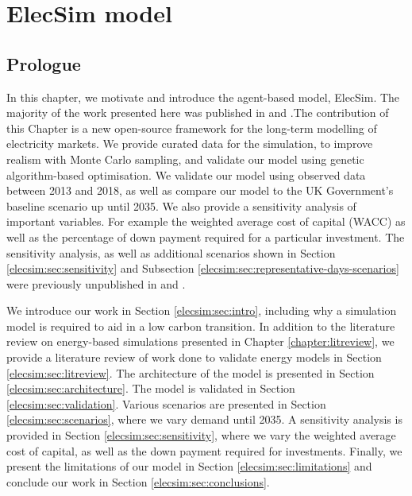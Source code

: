 \chapter{ElecSim model}
\label{chapter:elecsim}

\ifpdf
\graphicspath{{Chapter3/Figs/Raster/}{Chapter3/Figs/PDF/}{Chapter3/Figs/}}
\else
\graphicspath{{Chapter3/Figs/Vector/}{Chapter3/Figs/}}
\fi

\section*{Prologue}

In this chapter, we motivate and introduce the agent-based model, ElecSim. The majority of the work presented here was published in \cite{Kell} and \cite{Kell2020}.The contribution of this Chapter is a new open-source framework for the long-term modelling of electricity markets. We provide curated data for the simulation, to improve realism with Monte Carlo sampling, and validate our model using genetic algorithm-based optimisation. We validate our model using observed data between 2013 and 2018, as well as compare our model to the UK Government's baseline scenario up until 2035. We also provide a sensitivity analysis of important variables. For example the weighted average cost of capital (WACC) as well as the percentage of down payment required for a particular investment. The sensitivity analysis, as well as additional scenarios shown in Section \ref{elecsim:sec:sensitivity} and Subsection \ref{elecsim:sec:representative-days-scenarios} were previously unpublished in \cite{Kell} and \cite{Kell2020}.

We introduce our work in Section \ref{elecsim:sec:intro}, including why a simulation model is required to aid in a low carbon transition. In addition to the literature review on energy-based simulations presented in Chapter \ref{chapter:litreview}, we provide a literature review of work done to validate energy models in Section \ref{elecsim:sec:litreview}. The architecture of the model is presented in Section \ref{elecsim:sec:architecture}. The model is validated in Section \ref{elecsim:sec:validation}. Various scenarios are presented in Section \ref{elecsim:sec:scenarios}, where we vary demand until 2035. A sensitivity analysis is provided in Section \ref{elecsim:sec:sensitivity}, where we vary the weighted average cost of capital, as well as the down payment required for investments. Finally, we present the limitations of our model in Section \ref{elecsim:sec:limitations} and conclude our work in Section \ref{elecsim:sec:conclusions}.



